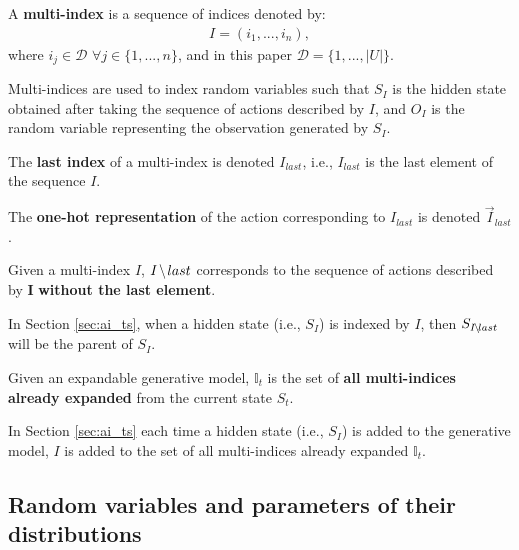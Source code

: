 \documentclass[twoside,11pt]{article}
\newcommand*\IdMLast[1]{{\normalfont #1\hspace{-0.04cm}\setminus\hspace{-0.04cm} last}}
\begin{document}
\begin{definition}
A \textbf{multi-index} is a sequence of indices denoted by:
\begin{align}
I = (i_1, ..., i_n),
\end{align}
where $i_j \in \mathcal{D} \,\,\forall j \in \{1, ..., n\}$, and in this paper $\mathcal{D} = \{1, ..., |U|\}$.
\end{definition}

\begin{remark}
Multi-indices are used to index random variables such that $S_I$ is the hidden state obtained after taking the sequence of actions described by $I$, and $O_I$ is the random variable representing the observation generated by $S_I$.
\end{remark}

\begin{definition}
The \textbf{last index} of a multi-index is denoted $I_{last}$, i.e., $I_{last}$ is the last element of the sequence $I$.
\end{definition}

\begin{definition}
The \textbf{one-hot representation} of the action corresponding to $I_{last}$ is denoted $\vec{I}_{last}$.
\end{definition}

\begin{definition}
Given a multi-index $I$, $\IdMLast{I}$ corresponds to the sequence of actions described by $\bm{I}$ \textbf{without the last element}.
\end{definition}

\begin{remark}
In Section \ref{sec:ai_ts}, when a hidden state (i.e., $S_I$) is indexed by $I$, then $S_{\IdMLast{I}}$ will be the parent of $S_I$.
\end{remark}

\begin{definition}
Given an expandable generative model, $\mathbb{I}_t$ is the set of \textbf{all multi-indices already expanded} from the current state $S_t$.
\end{definition}

\begin{remark}
In Section \ref{sec:ai_ts} each time a hidden state (i.e., $S_I$) is added to the generative model, $I$ is added to the set of all multi-indices already expanded $\mathbb{I}_t$.
\end{remark}

\subsection*{Random variables and parameters of their distributions}
\end{document}
